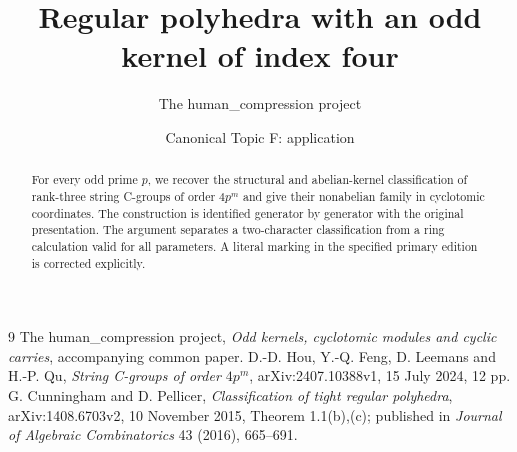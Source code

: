 
\title{Regular polyhedra with an odd kernel of index four}
\author{The human\_compression project}
\date{Canonical Topic F: application}

\maketitle
\begin{abstract}
For every odd prime $p$, we recover the structural and abelian-kernel
classification of rank-three string C-groups of order $4p^m$ and give
their nonabelian family in cyclotomic coordinates. The construction is
identified generator by generator with the original presentation.
The argument separates a two-character classification from a ring
calculation valid for all parameters. A literal marking in the specified
primary edition is corrected explicitly.
\end{abstract}





\begin{thebibliography}{9}
 The human\_compression project,
\emph{Odd kernels, cyclotomic modules and cyclic carries}, accompanying common paper.
 D.-D. Hou, Y.-Q. Feng, D. Leemans and H.-P. Qu,
\emph{String C-groups of order $4p^m$}, arXiv:2407.10388v1,
15 July 2024, 12 pp.
 G. Cunningham and D. Pellicer,
\emph{Classification of tight regular polyhedra}, arXiv:1408.6703v2,
10 November 2015, Theorem 1.1(b),(c); published in
\emph{Journal of Algebraic Combinatorics} 43 (2016), 665--691.
\end{thebibliography}

